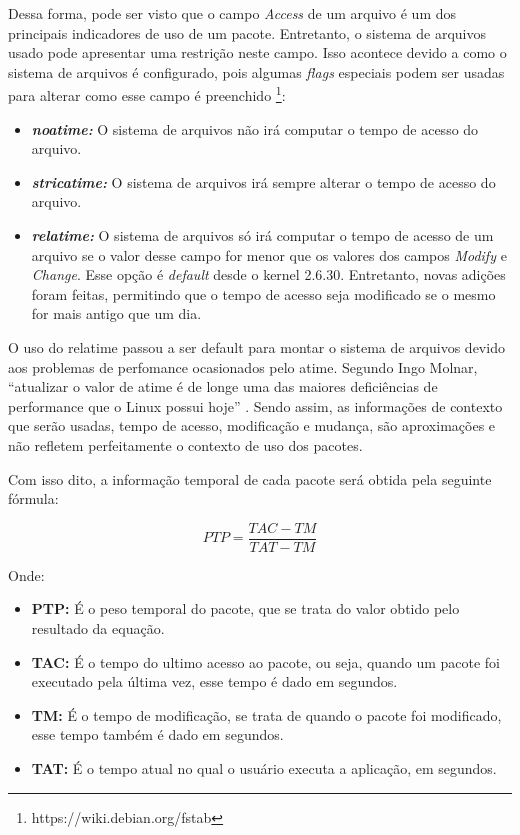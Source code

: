 Dessa forma, pode ser visto que o campo \textit{Access} de um arquivo é um dos
principais indicadores de uso de um pacote. Entretanto, o sistema de arquivos
usado pode apresentar uma
restrição neste campo. Isso acontece devido a como o sistema de arquivos é
configurado, pois algumas \textit{flags} especiais podem ser usadas para alterar como
esse campo é preenchido \footnote{https://wiki.debian.org/fstab}:

\begin{itemize}
    \item \textit{\textbf{noatime:}} O sistema de arquivos não irá computar o tempo de
        acesso do arquivo.
    \item \textit{\textbf{stricatime:}} O sistema de arquivos irá sempre alterar o tempo
        de acesso do arquivo.
    \item \textit{\textbf{relatime:}} O sistema de arquivos só irá computar o tempo de
        acesso de um arquivo se o valor desse campo for menor que os valores dos
        campos \textit{Modify} e \textit{Change}. Esse opção é \textit{default} desde
        o kernel 2.6.30. Entretanto, novas adições foram feitas, permitindo que
        o tempo de acesso seja modificado se o mesmo for mais antigo que um dia.
\end{itemize}

O uso do relatime passou a ser default para montar o sistema de arquivos devido
aos problemas de perfomance ocasionados pelo atime. Segundo Ingo Molnar,
``atualizar o valor de atime é de longe uma das maiores deficiências de
performance que o Linux possui hoje'' \cite{3_corbet_2007}. Sendo assim, as
informações de contexto que serão usadas, tempo de acesso, modificação e
mudança, são aproximações e não refletem perfeitamente o contexto de uso dos
pacotes.

Com isso dito, a informação temporal de cada pacote será obtida pela seguinte
fórmula:

\begin{equation} \label{eq:peso_temporal_do_pacote}
PTP = \frac{TAC - TM}{TAT - TM}
\end{equation}

Onde:

\begin{itemize}
    \item \textbf{PTP:} É o peso temporal do pacote, que se trata do valor
    obtido pelo resultado da equação.
    \item \textbf{TAC:} É o tempo do ultimo acesso ao pacote, ou seja, quando
    um pacote foi executado pela última vez, esse tempo é dado em segundos.
    \item \textbf{TM:} É o tempo de modificação, se trata de quando o pacote
    foi modificado, esse tempo também é dado em segundos.
    \item \textbf{TAT:} É o tempo atual no qual o usuário executa a aplicação,
    em segundos.
\end{itemize}


